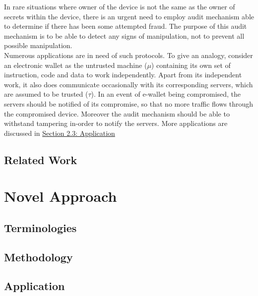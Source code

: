 \documentclass[12pt, letter]{article}
\begin{document}
In rare situations where owner of the device is not the same as the owner of secrets within the device, there is an urgent need to employ audit mechanism able to determine if there has been some attempted fraud. The purpose of this audit mechanism is to be able to detect any signs of manipulation, not to prevent all possible manipulation.\\

Numerous applications are in need of such protocols. To give an analogy, consider an electronic wallet as the untrusted machine ($\mu$) containing its own set of instruction, code and data to work independently. Apart from its independent work, it also does communicate occasionally with its corresponding servers, which are assumed to be trusted ($\tau$). In an event of e-wallet being compromised, the servers should be notified of its compromise, so that no more traffic flows through the compromised device. Moreover the audit mechanism should be able to withstand tampering in-order to notify the servers. More applications are discussed in \hyperref[sec:application]{Section 2.3: Application}




\subsection{Related Work}

\blindtext

\section{Novel Approach}

\blindtext

\subsection{Terminologies}

\blindtext

\subsection{Methodology}

\blindtext

\subsection{Application}
\label{sec:application}

\blindtext
\end{document}
